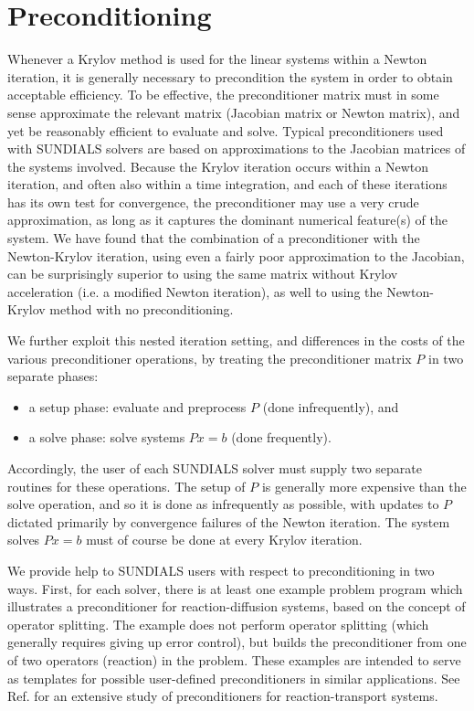 \section{Preconditioning}\label{s:preconditioning}

Whenever a Krylov method is used for the linear systems within a
Newton iteration, it is generally necessary to precondition the system
in order to obtain acceptable efficiency.  To be effective, the
preconditioner matrix must in some sense approximate the relevant
matrix (Jacobian matrix or Newton matrix), and yet be reasonably
efficient to evaluate and solve.  Typical preconditioners used with
SUNDIALS solvers are based on approximations to the Jacobian matrices
of the systems involved.  Because the Krylov iteration occurs within a
Newton iteration, and often also within a time integration, and each
of these iterations has its own test for convergence, the
preconditioner may use a very crude approximation, as long as it
captures the dominant numerical feature(s) of the system.  
We have found that the combination of a preconditioner with the
Newton-Krylov iteration, using even a fairly poor approximation to
the Jacobian, can be surprisingly superior to using the same matrix
without Krylov acceleration (i.e. a modified Newton iteration), as
well to using the Newton-Krylov method with no preconditioning.

We further exploit this nested iteration setting, and differences in
the costs of the various preconditioner operations, by treating the
preconditioner matrix $P$ in two separate phases:
\begin{itemize}
\item a setup phase: evaluate and preprocess $P$ (done infrequently), and
\item a solve phase: solve systems $Px = b$ (done frequently).
\end{itemize}
Accordingly, the user of each SUNDIALS solver must supply two separate
routines for these operations.  The setup of $P$ is generally more
expensive than the solve operation, and so it is done as infrequently
as possible, with updates to $P$ dictated primarily by convergence
failures of the Newton iteration.  The system solves $Px = b$ must of
course be done at every Krylov iteration.

We provide help to SUNDIALS users with respect to preconditioning in
two ways.  First, for each solver, there is at least one example
problem program which illustrates a preconditioner for
reaction-diffusion systems, based on the concept of operator
splitting.  The example does not perform operator splitting (which
generally requires giving up error control), but builds the
preconditioner from one of two operators (reaction) in the problem.
These examples are intended to serve as templates for possible
user-defined preconditioners in similar applications.  See
Ref. \cite{BrHi:89} for an extensive study of preconditioners for
reaction-transport systems.

